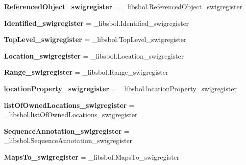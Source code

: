 \begin{DoxyCompactItemize}
\item 
{\bfseries Referenced\+Object\+\_\+swigregister} = \+\_\+libsbol.\+Referenced\+Object\+\_\+swigregister\hypertarget{namespacesbol_1_1libsbol_a625ea138429e745f1231de469fffb5a7}{}\label{namespacesbol_1_1libsbol_a625ea138429e745f1231de469fffb5a7}

\item 
{\bfseries Identified\+\_\+swigregister} = \+\_\+libsbol.\+Identified\+\_\+swigregister\hypertarget{namespacesbol_1_1libsbol_a16eb22e3d79514193951fff981fb8d7a}{}\label{namespacesbol_1_1libsbol_a16eb22e3d79514193951fff981fb8d7a}

\item 
{\bfseries Top\+Level\+\_\+swigregister} = \+\_\+libsbol.\+Top\+Level\+\_\+swigregister\hypertarget{namespacesbol_1_1libsbol_af56135014e4831645847f1592b126bfd}{}\label{namespacesbol_1_1libsbol_af56135014e4831645847f1592b126bfd}

\item 
{\bfseries Location\+\_\+swigregister} = \+\_\+libsbol.\+Location\+\_\+swigregister\hypertarget{namespacesbol_1_1libsbol_a9c3d7d2b5f0f3f1b1a1c2dd8d8743807}{}\label{namespacesbol_1_1libsbol_a9c3d7d2b5f0f3f1b1a1c2dd8d8743807}

\item 
{\bfseries Range\+\_\+swigregister} = \+\_\+libsbol.\+Range\+\_\+swigregister\hypertarget{namespacesbol_1_1libsbol_a1e0d5bc0055d40e7f379ced13c2a40a0}{}\label{namespacesbol_1_1libsbol_a1e0d5bc0055d40e7f379ced13c2a40a0}

\item 
{\bfseries location\+Property\+\_\+swigregister} = \+\_\+libsbol.\+location\+Property\+\_\+swigregister\hypertarget{namespacesbol_1_1libsbol_ad11ee5242c8178d01b93a3547a9df9f3}{}\label{namespacesbol_1_1libsbol_ad11ee5242c8178d01b93a3547a9df9f3}

\item 
{\bfseries list\+Of\+Owned\+Locations\+\_\+swigregister} = \+\_\+libsbol.\+list\+Of\+Owned\+Locations\+\_\+swigregister\hypertarget{namespacesbol_1_1libsbol_af24fe935669eeba1426a6bbee1871c7d}{}\label{namespacesbol_1_1libsbol_af24fe935669eeba1426a6bbee1871c7d}

\item 
{\bfseries Sequence\+Annotation\+\_\+swigregister} = \+\_\+libsbol.\+Sequence\+Annotation\+\_\+swigregister\hypertarget{namespacesbol_1_1libsbol_a293e05dde3346496772a77026f156e8b}{}\label{namespacesbol_1_1libsbol_a293e05dde3346496772a77026f156e8b}

\item 
{\bfseries Maps\+To\+\_\+swigregister} = \+\_\+libsbol.\+Maps\+To\+\_\+swigregister\hypertarget{namespacesbol_1_1libsbol_a1fbdee47007e2291e3d2f97f7acd5aea}{}\label{namespacesbol_1_1libsbol_a1fbdee47007e2291e3d2f97f7acd5aea}


\end{DoxyCompactItemize}
